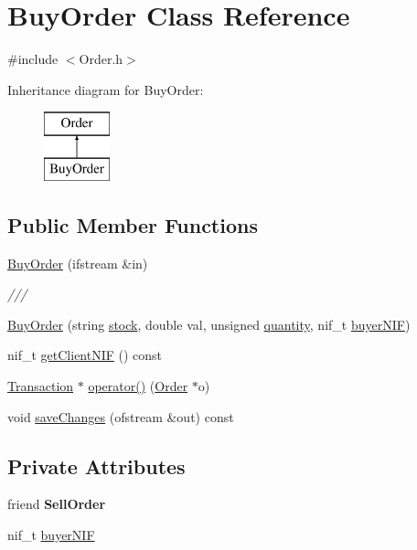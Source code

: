 \hypertarget{class_buy_order}{}\section{Buy\+Order Class Reference}
\label{class_buy_order}


{\ttfamily \#include $<$Order.\+h$>$}

Inheritance diagram for Buy\+Order\+:\begin{figure}[H]
\begin{center}
\leavevmode
\includegraphics[height=2.000000cm]{class_buy_order}
\end{center}
\end{figure}
\subsection*{Public Member Functions}
\begin{DoxyCompactItemize}
\item 
\hyperlink{class_buy_order_acbf093767d9d108b9448f2eefb5f58cd}{Buy\+Order} (ifstream \&in)
\begin{DoxyCompactList}\small\item\em /// \end{DoxyCompactList}\item 
\hyperlink{class_buy_order_a1fcd1c4a28acdf04bfdf99c5b16b4e7d}{Buy\+Order} (string \hyperlink{class_order_aafb6dfab2a1c253eefd78840b27dcd2e}{stock}, double val, unsigned \hyperlink{class_order_ab02e2baeb8c57217a20c9124df3ba11d}{quantity}, nif\+\_\+t \hyperlink{class_buy_order_a5914aebb1dd8bb32d1b7481235d833fc}{buyer\+N\+IF})
\item 
nif\+\_\+t \hyperlink{class_buy_order_ab79597b9bf0656216b2283bfa3a650e0}{get\+Client\+N\+IF} () const
\item 
\hyperlink{class_transaction}{Transaction} $\ast$ \hyperlink{class_buy_order_a45641eed13ea191fff675745a618b9f5}{operator()} (\hyperlink{class_order}{Order} $\ast$o)
\item 
void \hyperlink{class_buy_order_aa4f087d0dbc1f6e8937c0b3679fc2f7b}{save\+Changes} (ofstream \&out) const
\end{DoxyCompactItemize}
\subsection*{Private Attributes}
\begin{DoxyCompactItemize}
\item 
\mbox{\label{class_buy_order_ac67ae4ec42300c879e4bfd2e2cd2adb2}} 
friend {\bfseries Sell\+Order}
\item 
nif\+\_\+t \hyperlink{class_buy_order_a5914aebb1dd8bb32d1b7481235d833fc}{buyer\+N\+IF}
\end{DoxyCompactItemize}
